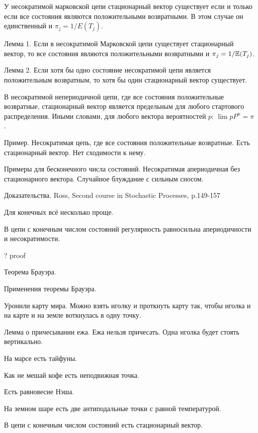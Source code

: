 \begin{theorem}
У несократимой марковской цепи стационарный вектор существует если и только если все состояния являются положительными возвратными. В этом случае он единственный и $\pi_j=1/E(T_j)$.
\end{theorem}



Лемма 1. Если в несократимой Марковской цепи существует стационарный вектор, то все состояния являются положительными возвратными и $\pi_j=1/\mathbb{E}(T_j)$.


Лемма 2. Если хотя бы одно состояние несократимой цепи является положительным возвратным, то хотя бы один стационарный вектор существует.


\begin{theorem}
В несократимой непериодичной цепи, где все состояния положительные возвратные, стационарный вектор является предельным для любого стартового распределения. Иными словами, для любого вектора вероятностей $p$: $\lim p P^{n}=\pi$.
\end{theorem}

Пример. Несократимая цепь, где все состояния положительные возвратные. Есть стационарный вектор. Нет сходимости к нему.


Примеры для бесконечного числа состояний. Несократимая апериодичная без стационарного вектора. Случайное блуждание с сильным сносом.


Доказательства. Ross, Second course in Stochastic Processes, p.149-157

Для конечных всё несколько проще. 

\begin{theorem}
В цепи с конечным числом состояний регулярность равносильна апериодичности и несократимости.
\end{theorem}

? proof


Теорема Брауэра.


Применения теоремы Брауэра.

Уронили карту мира. Можно взять иголку и проткнуть карту так, чтобы иголка и на карте и на земле воткнулась в одну точку.


Лемма о причесывании ежа. Ежа нельзя причесать. Одна иголка будет стоять вертикально.


На марсе есть тайфуны. 


Как не мешай кофе есть неподвижная точка.


Есть равновесие Нэша.


На земном шаре есть две антиподальные точки с равной температурой.


\begin{theorem}
В цепи с конечным числом состояний есть стационарный вектор.
\end{theorem}


